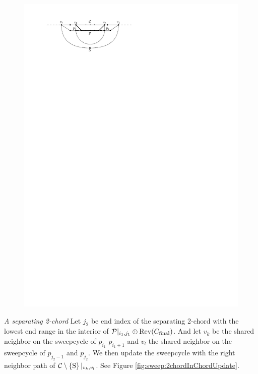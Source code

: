     \begin{figure}[h]
      \centering
      \includegraphics[scale=1]{unifiedAlgo/img/sweep/chordUpdate}
      \caption{}
      \label{fig:sweep:chordUpdate}
    \end{figure}

    \emph{A separating 2-chord}
      Let $j_2$ be end index of the separating 2-chord with the lowest end range in the interior of $\mathcal{P}|_{i_1, j_1} \oplus \operatorname{Rev}({C_\text{final}})$. And let $v_k$ be the shared neighbor on the sweepcycle of $p_{i_1}$ $p_{i_1 +1}$ and $v_l$ the shared neighbor on the sweepcycle  of $p_{j_2 -1}$ and $p_{j_2}$.
      We then update the sweepcycle with the right neighbor path of $\mathcal{C} \setminus \left\lbrace {\mathrm{S}} \right\rbrace|_{v_k, v_l}$. See Figure \ref{fig:sweep:2chordInChordUpdate}.

